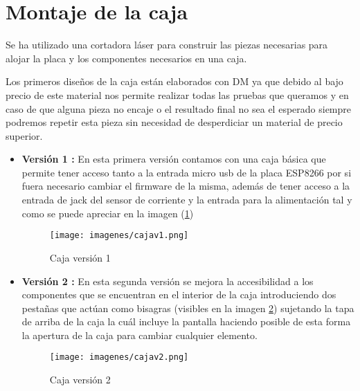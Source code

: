 \section{Montaje de la caja}

Se ha utilizado una cortadora láser para construir las piezas necesarias para alojar la placa y los componentes necesarios en una caja.

Los primeros diseños de la caja están elaborados con DM ya que debido al bajo precio de este material nos permite realizar todas las pruebas que queramos y en caso de que alguna pieza no encaje o el resultado final no sea el esperado siempre podremos repetir esta pieza sin necesidad de desperdiciar un material de precio superior.

\begin{itemize}
	\item \textbf{Versión 1 :} En esta primera versión contamos con una caja básica que permite tener acceso tanto a la entrada micro usb de la placa ESP8266 por si fuera necesario cambiar el firmware de la misma, además de tener acceso a la entrada de jack del sensor de corriente y la entrada para la alimentación tal y como se puede apreciar en la imagen (\ref{fig:cajav1})
	
	\begin{figure}[H]
		\centering
		\texttt{[image: imagenes/cajav1.png]}
		\caption{Caja versión 1}
		\label{fig:cajav1}
	\end{figure}
	
	
	\item \textbf{Versión 2 :} En esta segunda versión se mejora la accesibilidad a los componentes que se encuentran en el interior de la caja introduciendo dos pestañas que actúan como bisagras (visibles en la imagen \ref{fig:cajav2}) sujetando la tapa de arriba de la caja la cuál incluye la pantalla haciendo posible de esta forma la apertura de la caja para cambiar cualquier elemento.
	
	\begin{figure}[H]
		\centering
		\texttt{[image: imagenes/cajav2.png]}
		\caption{Caja versión 2}
		\label{fig:cajav2}
	\end{figure}
	
\end{itemize}